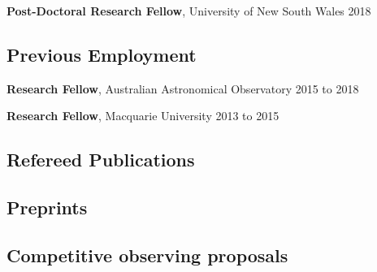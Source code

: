 \documentclass[10pt]{article}
\newcommand{\cvlist}{}
\begin{document}
\textbf{Post-Doctoral Research Fellow},
            University of New South Wales
            \hfill {2018}

\vspace{0.1in}

\subsection*{Previous Employment}

\textbf{Research Fellow},
            Australian Astronomical Observatory
            \hfill {2015 to 2018}

\textbf{Research Fellow},
            Macquarie University
            \hfill {2013 to 2015}

\vspace{0.1in}

\subsection*{Refereed Publications}

\begin{list}{}{\cvlist}

\end{list}

\subsection*{Preprints}
\begin{list}{}{\cvlist}

\end{list}

\subsection*{Competitive observing proposals}
\end{document}
